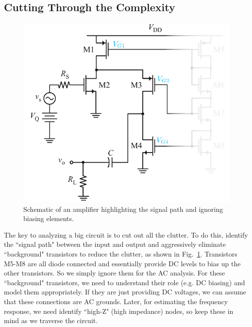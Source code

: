 \subsection{Cutting Through the Complexity}
\begin{figure}[tb]
\centering
\includegraphics[scale=1]{17cascode_folded_declutter}
\caption{Schematic of an amplifier highlighting the signal path and ignoring biasing elements.} \label{fig:17cascode_folded_declutter}
\end{figure}
The key to analyzing a big circuit is to cut out all the clutter.  To do this, identify the ``signal path" between the input and output and aggressively eliminate ``background" transistors to reduce the clutter, as shown in Fig.~\ref{fig:17cascode_folded_declutter}.  Transistors M5-M8 are all diode connected and essentially provide DC levels to bias up the other transistors.  So we simply ignore them for the AC analysis.  For these ``background" transistors, we need to understand their role (e.g. DC biasing) and model them appropriately.  If they are just providing DC voltages, we can assume that these connections are AC grounds.  Later, for estimating the frequency response, we need identify ``high-Z" (high impedance) nodes, so keep these in mind as we traverse the circuit.

